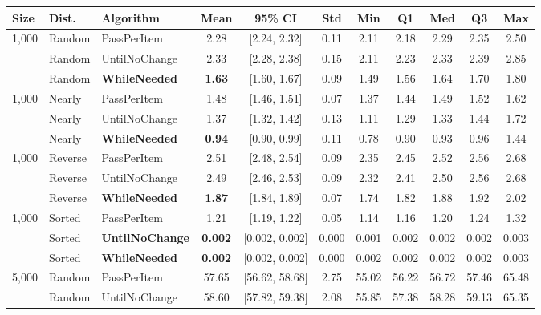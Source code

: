 \documentclass[10pt,a4paper]{article}
\begin{document}
\begin{center}
\label{tab:stats}
\footnotesize
\setlength{\tabcolsep}{3.5pt}
\begin{tabular}{|l|l|l|c|c|c|c|c|c|c|c|}
\hline
\rowcolor{black} \color{white}\textbf{Size} & \color{white}\textbf{Dist.} & \color{white}\textbf{Algorithm} & \color{white}\textbf{Mean} & \color{white}\textbf{95\% CI} & \color{white}\textbf{Std} & \color{white}\textbf{Min} & \color{white}\textbf{Q1} & \color{white}\textbf{Med} & \color{white}\textbf{Q3} & \color{white}\textbf{Max} \\
\hline
1,000 & Random & PassPerItem & 2.28 & [2.24, 2.32] & 0.11 & 2.11 & 2.18 & 2.29 & 2.35 & 2.50 \\
 & Random & UntilNoChange & 2.33 & [2.28, 2.38] & 0.15 & 2.11 & 2.23 & 2.33 & 2.39 & 2.85 \\
 & Random & \textbf{WhileNeeded} & \textbf{1.63} & [1.60, 1.67] & 0.09 & 1.49 & 1.56 & 1.64 & 1.70 & 1.80 \\
\hline
1,000 & Nearly & PassPerItem & 1.48 & [1.46, 1.51] & 0.07 & 1.37 & 1.44 & 1.49 & 1.52 & 1.62 \\
 & Nearly & UntilNoChange & 1.37 & [1.32, 1.42] & 0.13 & 1.11 & 1.29 & 1.33 & 1.44 & 1.72 \\
 & Nearly & \textbf{WhileNeeded} & \textbf{0.94} & [0.90, 0.99] & 0.11 & 0.78 & 0.90 & 0.93 & 0.96 & 1.44 \\
\hline
1,000 & Reverse & PassPerItem & 2.51 & [2.48, 2.54] & 0.09 & 2.35 & 2.45 & 2.52 & 2.56 & 2.68 \\
 & Reverse & UntilNoChange & 2.49 & [2.46, 2.53] & 0.09 & 2.32 & 2.41 & 2.50 & 2.56 & 2.68 \\
 & Reverse & \textbf{WhileNeeded} & \textbf{1.87} & [1.84, 1.89] & 0.07 & 1.74 & 1.82 & 1.88 & 1.92 & 2.02 \\
\hline
1,000 & Sorted & PassPerItem & 1.21 & [1.19, 1.22] & 0.05 & 1.14 & 1.16 & 1.20 & 1.24 & 1.32 \\
 & Sorted & \textbf{UntilNoChange} & \textbf{0.002} & [0.002, 0.002] & 0.000 & 0.001 & 0.002 & 0.002 & 0.002 & 0.003 \\
 & Sorted & \textbf{WhileNeeded} & \textbf{0.002} & [0.002, 0.002] & 0.000 & 0.002 & 0.002 & 0.002 & 0.002 & 0.003 \\
\hline
\hline
5,000 & Random & PassPerItem & 57.65 & [56.62, 58.68] & 2.75 & 55.02 & 56.22 & 56.72 & 57.46 & 65.48 \\
 & Random & UntilNoChange & 58.60 & [57.82, 59.38] & 2.08 & 55.85 & 57.38 & 58.28 & 59.13 & 65.35 \\

\end{tabular}
\end{center}
\end{document}

